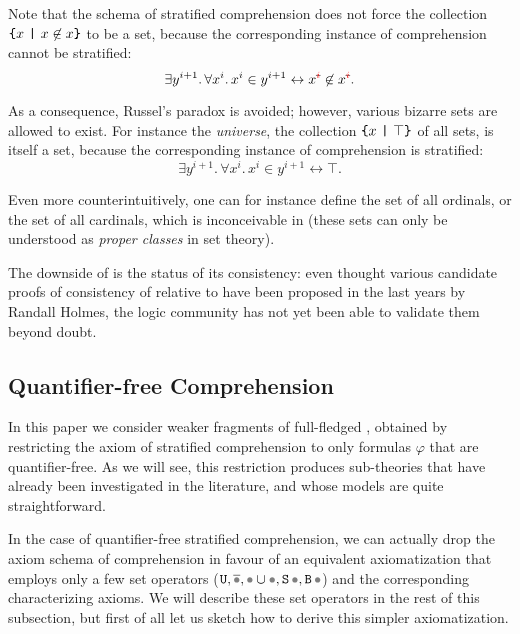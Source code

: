 \documentclass[sigplan,10pt,anonymous,review]{acmart}%
\begin{document}
Note that the schema of stratified comprehension does not force the collection $\text{\texttt{\{}} x ~\text{\texttt{|}}~ x \not\in x \text{\texttt{\}}}$ to be a set, because the corresponding instance of comprehension cannot be stratified:
% 
\[ \exists y^{i+1}.\, \forall x^i.\, x^i \in y^{i+1} \leftrightarrow x^{\stkout{\textcolor{red}i}} \not\in x^{\stkout{\textcolor{red}i}}. \]

As a consequence, Russel's paradox is avoided; however, various bizarre sets are allowed to exist. For instance the \emph{universe}, the collection $\text{\texttt{\{}} x ~\text{\texttt{|}}~ \top \text{\texttt{\}}}$ of all sets, is itself a set, because the corresponding instance of comprehension is stratified:
% 
\[ \exists y^{i+1}.\, \forall x^i.\, x^i \in y^{i+1} \leftrightarrow \top. \]

Even more counterintuitively, one can for instance define the set of all ordinals, or the set of all cardinals, which is inconceivable in \ZF{} (these sets can only be understood as \emph{proper classes} in \ZF{} set theory).

\medskip

The downside of \NF{} is the status of its consistency: even thought various candidate proofs of consistency of \NF{} relative to \ZF{} have been proposed in the last years by Randall Holmes, the logic community has not yet been able to validate them beyond doubt.

\subsection{Quantifier-free Comprehension}\label{subs:qfc}

In this paper we consider weaker fragments of full-fledged \NF{}, obtained by restricting the axiom of stratified comprehension to only formulas $\varphi$ that are quantifier-free. As we will see, this restriction produces sub-theories that have already been investigated in the literature, and whose models are quite straightforward.

In the case of quantifier-free stratified comprehension, we can actually drop the axiom schema of comprehension in favour of an equivalent axiomatization that employs only a few set operators ($\Universe, \Complement \Placeholder, \Union \Placeholder \Placeholder, \Sing\Placeholder, \Essence\Placeholder$) and the corresponding characterizing axioms. We will describe these set operators in the rest of this subsection, but first of all let us sketch how to derive this simpler axiomatization.

\medskip
\end{document}
